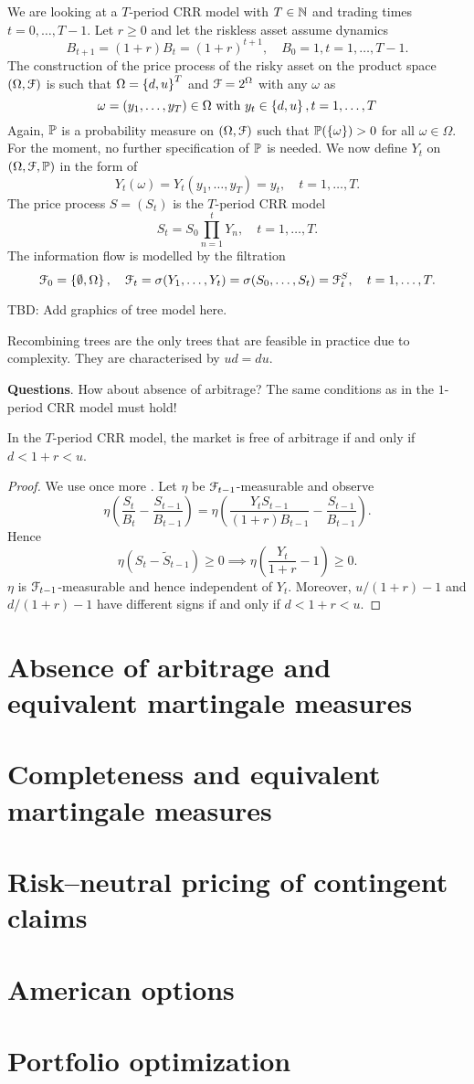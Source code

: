 \documentclass[12pt]{amsart}
\begin{document}
We are looking at a \(T\)-period CRR model with \(T \in \N\) and trading times \(t=0, \dots, T-1\). Let \(r \geq 0\) and let the riskless asset assume dynamics \[
    B_{t+1} = (1+r) B_t = (1+r)^{t+1},\quad B_0=1, t = 1, \dots, T-1.
\]
The construction of the price process of the risky asset on the product space \((\Omega, \cF)\) is such that \(\Omega = \set{d,u}^T\) and \(\cF = 2^\Omega\) with any \(\omega\) as \[
    \omega = (y_1, \dots, y_T) \in \Omega \text{ with } y_t \in \set{d, u}, t = 1, \dots, T
\]
Again, \(\P\) is a probability measure on \((\Omega, \cF)\) such that \(\P(\set{\omega}) > 0\) for all \(\omega \in \Omega\).
For the moment, no further specification of \(\P\) is needed. We now define \(Y_t\) on \((\Omega, \cF, \P)\) in the form of \[
    Y_t(\omega) = Y_t(y_1, \dots, y_T) = y_t, \quad t=1, \dots, T.
\]
The price process \(S=(S_t)\) is the \(T\)-period CRR model \[
    S_t = S_0 \prod_{n=1}^t Y_n, \quad t=1, \dots, T.
\]
The information flow is modelled by the filtration \[
    \cF_0 = \set{\emptyset, \Omega}, \quad \cF_t = \sigma(Y_1, \dots, Y_t) = \sigma(S_0, \dots, S_t) = \cF_t^S, \quad t=1, \dots, T.
\]

\color{red}TBD: Add graphics of tree model here.\color{black}

\begin{remark}
    Recombining trees are the only trees that are feasible in practice due to complexity. They are characterised by \(ud=du\).
\end{remark}

\textbf{Questions}. How about absence of arbitrage? The same conditions as in the \(1\)-period CRR model must hold!

\begin{theorem}
    In the \(T\)-period CRR model, the market is free of arbitrage if and only if \(d < 1+r < u\).
\end{theorem}
\begin{proof}
    We use once more .
    Let \(\eta\) be \(\cF_{t-1}\)-measurable and observe \[
        \eta\left(\frac{S_t}{B_t}-\frac{S_{t-1}}{B_{t-1}}\right) = \eta\left( \frac{Y_tS_{t-1}}{(1+r)B_{t-1}}-\frac{S_{t-1}}{B_{t-1}} \right).
    \]
    Hence \[
        \eta(S_t-\tilde{S}_{t-1}) \geq 0 \implies \eta\left(\frac{Y_t}{1+r}-1\right) \geq 0.
    \]
    \(\eta\) is \(\cF_{t-1}\)-measurable and hence independent of \(Y_t\). Moreover, \(u/(1+r)-1\) and \(d/(1+r)-1\) have different signs if and only if \(d < 1+r < u\).
\end{proof}

\section{Absence of arbitrage and equivalent martingale measures}
\section{Completeness and equivalent martingale measures}
\section{Risk--neutral pricing of contingent claims}
\section{American options}
\section{Portfolio optimization}
\end{document}
